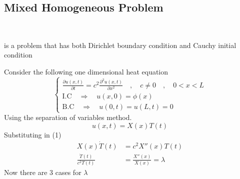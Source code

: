 \subsection{Mixed Homogeneous Problem}
\ 
\begin{definition}
    is a problem that has both Dirichlet boundary condition and Cauchy initial condition
\end{definition}
Consider the following one dimensional heat equation 
\begin{equation}
    \begin{cases}
        \displaystyle \frac{\partial u(x,t)}{\partial t} = c^2\frac{\partial^2 u(x,t)}{\partial x^2} \quad,\quad c\neq0 \quad,\quad 0<x<L
        \\
        \text{I.C} \quad \Longrightarrow \quad u(x,0) = \phi(x)
        \\
        \text{B.C} \quad \Longrightarrow \quad u(0,t) = u(L,t) = 0
    \end{cases}
\end{equation}
Using the separation of variables method.
\begin{equation}
u(x,t) = X(x)T(t)
\end{equation}
Substituting in (1)
\begin{align*}
X(x)\dot{T}(t) &= c^2 X''(x)T(t)
\\
\frac{\dot{T}(t)}{c^2 T(t)} &= \frac{X''(x)}{X(x)} = \lambda
\end{align*}
Now there are 3 cases for $\lambda$
